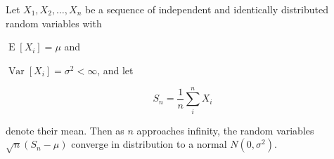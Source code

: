 \documentclass{article}
\begin{document}
Let $X_1, X_2, \ldots, X_n$ be a sequence of independent and
identically distributed random variables with

$\operatorname{E}[X_i] = \mu$ and

$\operatorname{Var}[X_i] = \sigma^2 < \infty$, and let

\begin{equation*}
S_n = \frac{1}{n}\sum_{i}^{n} X_i
\end{equation*}

denote their mean. Then as $n$ approaches infinity, the
random variables $\sqrt{n}(S_n - \mu)$ converge in
distribution to a normal $N(0, \sigma^2)$.

\end{document}
